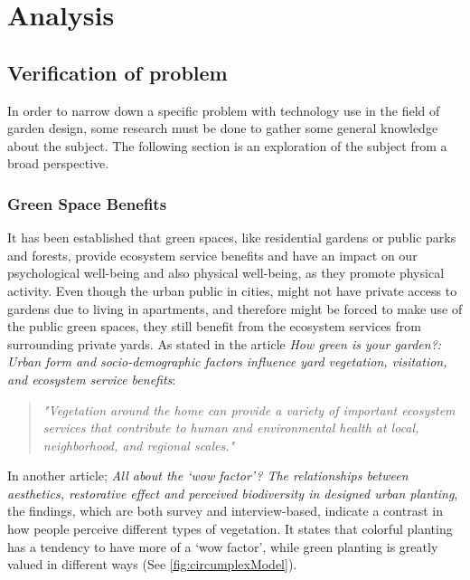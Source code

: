 \chapter{Analysis}	
		
	\section{Verification of problem}\label{sec:verification}
	In order to narrow down a specific problem with technology use in the field of garden design, some research must be done to gather some general knowledge about the subject. The following section is an exploration of the subject from a broad perspective.
		
 	\subsection{Green Space Benefits}
	It has been established that green spaces, like residential gardens or public parks and forests, provide ecosystem service benefits and have an impact on our psychological well-being and also physical well-being, as they promote physical activity\cite{urbanGreenSpace}\cite{healthBenefitsNature}. Even though the urban public in cities, might not have private access to gardens due to living in apartments, and therefore might be forced to make use of the public green spaces, they still benefit from the ecosystem services from surrounding private yards\cite{greenSpaceBenefits}. As stated in the article \textit{How green is your garden?: Urban form and socio-demographic factors influence yard vegetation, visitation, and ecosystem service benefits}:\\
	
	\begin{quote}
		\textit{"Vegetation around the home can provide a variety of important ecosystem services that contribute to human and environmental health at local, neighborhood, and regional scales\label{articleQuote}."}\\
	\end{quote}
	
	In another article; \textit{All about the ‘wow factor’? The relationships between aesthetics, restorative effect and perceived biodiversity in designed urban planting}\cite{wowFactor}, the findings, which are both survey and interview-based, indicate a contrast in how people perceive different types of vegetation. It states that colorful planting has a tendency to have more of a ‘wow factor’, while green planting is greatly valued in different ways (See \autoref{fig:circumplexModel}).
	
